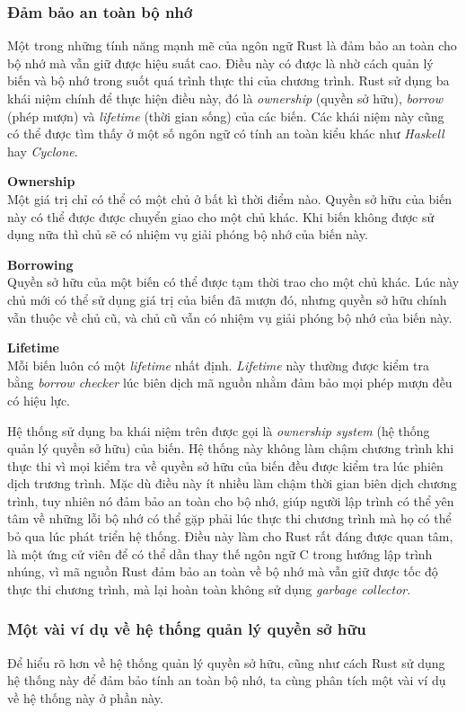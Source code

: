 \subsubsection{Đảm bảo an toàn bộ nhớ}
Một trong những tính năng mạnh mẽ của ngôn ngữ Rust là đảm bảo an toàn cho bộ nhớ mà vẫn giữ được hiệu suất cao.
Điều này có được là nhờ cách quản lý biến và bộ nhớ trong suốt quá trình thực thi của chương trình.
Rust sử dụng ba khái niệm chính để thực hiện điều này, đó là \emph{ownership} (quyền sở hữu), \emph{borrow} (phép mượn) và \emph{lifetime} (thời gian sống) của các biến.
Các khái niệm này cũng có thể được tìm thấy ở một số ngôn ngữ có tính an toàn kiểu khác như \emph{Haskell} hay \emph{Cyclone}.

\textbf{Ownership}\\
\indent Một giá trị chỉ có thể có một chủ ở bất kì thời điểm nào. Quyền sở hữu của biến này có thể được được chuyển giao cho một chủ khác.
Khi biến không được sử dụng nữa thì chủ sẽ có nhiệm vụ giải phóng bộ nhớ của biến này.

\textbf{Borrowing}\\
\indent Quyền sở hữu của một biến có thể được tạm thời trao cho một chủ khác. Lúc này chủ mới có thể sử dụng giá trị của biến đã mượn đó, nhưng quyền sở hữu chính vẫn thuộc về chủ cũ, và chủ cũ vẫn có nhiệm vụ giải phóng bộ nhớ của biến này.

\textbf{Lifetime}\\
\indent Mỗi biến luôn có một \emph{lifetime} nhất định. \emph{Lifetime} này thường được kiểm tra bằng \emph{borrow checker} lúc biên dịch mã nguồn nhằm đảm bảo mọi phép mượn đều có hiệu lực.

Hệ thống sử dụng ba khái niệm trên được gọi là \emph{ownership system} (hệ thống quản lý quyền sở hữu) của biến.
Hệ thống này không làm chậm chương trình khi thực thi vì mọi kiểm tra về quyền sở hữu của biến đều được kiểm tra lúc phiên dịch trương trình.
Mặc dù điều này ít nhiều làm chậm thời gian biên dịch chương trình, tuy nhiên nó đảm bảo an toàn cho bộ nhớ, giúp người lập trình có thể yên tâm về những lỗi bộ nhớ có thể gặp phải lúc thực thi chương trình mà họ có thể bỏ qua lúc phát triển hệ thống.
Điều này làm cho Rust rất đáng được quan tâm, là một ứng cử viên để có thể dần thay thế ngôn ngữ C trong hướng lập trình nhúng, vì mã nguồn Rust đảm bảo an toàn về bộ nhớ mà vẫn giữ được tốc độ thực thi chương trình, mà lại hoàn toàn không sử dụng \emph{garbage collector}.

\pagebreak
\subsubsection{Một vài ví dụ về hệ thống quản lý quyền sở hữu}
Để hiểu rõ hơn về hệ thống quản lý quyền sở hữu, cũng như cách Rust sử dụng hệ thống này để đảm bảo tính an toàn bộ nhớ, ta cùng phân tích một vài ví dụ về hệ thống này ở phần này.

